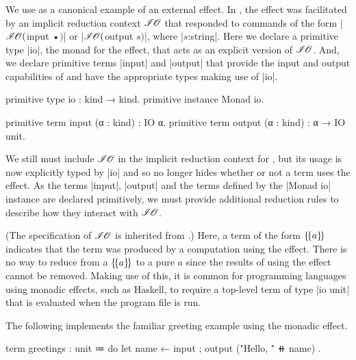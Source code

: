 \subsubsection{\IO}

We use \IO as a canonical example of an external effect.
In \LangB, the \IO effect was facilitated by an implicit reduction context $\mathscr{I\hspace{-0.1em}O}$ that responded to commands of the form \code|$\mathscr{I\hspace{-0.1em}O}($input •$)$| or \code|$\mathscr{I\hspace{-0.1em}O}($output $s$$)$|, where \code|$s$:string|.
Here we declare a primitive type \code|io|, the monad for the \IO effect, that acts as an explicit version of $\mathscr{I\hspace{-0.1em}O}$.
And, we declare primitive terms \code|input| and \code|output| that provide the input and output capabilities of \IO and have the appropriate types making use of \code|io|.
%
\begin{program}[caption={Definitions for the monadic \IO effect}]
primitive type io : kind → kind.
primitive instance Monad io.

primitive term input  (α : kind) : IO α.
primitive term output (α : kind) : α → IO unit.
\end{program}

We still must include $\mathscr{I\hspace{-0.1em}O}$ in the implicit reduction context for \LangC, but its usage is now explicitly typed by \code|io| and so no longer hides whether or not a term uses the \IO effect.
As the terms \code|input|, \code|output| and the terms defined by the \code|Monad io| instance are declared primitively, we must provide additional reduction rules to describe how they interact with $\mathscr{I\hspace{-0.1em}O}$.
%

%
\noindent
(The specification of $\mathscr{I\hspace{-0.1em}O}$ is inherited from \LangB.)
Here, a term of the form $\{\!\{ a \}\!\}$ indicates that the term was produced by a computation using the \IO effect.
There is no way to reduce from a $\{\!\{ a \}\!\}$ to a pure $a$ since the results of using the \IO effect cannot be removed.
Making use of this, it is common for programming languages using monadic effects, such as Haskell, to require a top-level term  of type \code|io unit| that is evaluated when the program file is run.

%
The following implements the familiar greeting example using the monadic \IO effect.
\begin{program}
term greetings : unit
  ≔ do
      { let name ← input
      ; output ("Hello, " ⧺ name) }.
\end{program}

